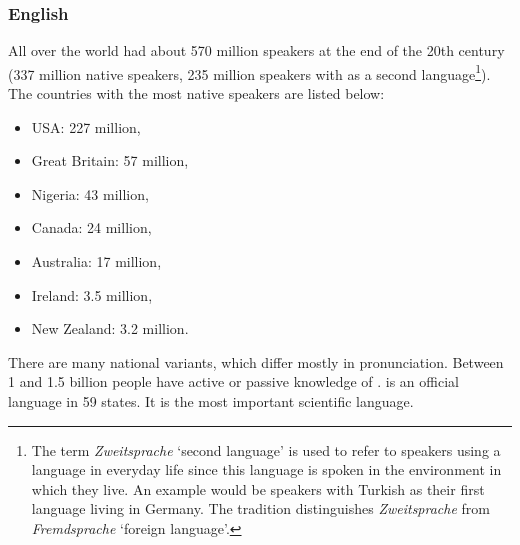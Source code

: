 \subsubsection{English}

All over the world  had about 570 million speakers at the end of the 20th century 
(337 million native speakers, 235 million speakers with  as a second language\footnote{%
  The term \emph{Zweitsprache} `second language' is used to refer to speakers using a language in
  everyday life since this language is spoken in the environment in which they live. An example would be speakers with
  Turkish as their first language living in Germany. The  tradition distinguishes
  \emph{Zweitsprache} from \emph{Fremdsprache} `foreign language'.%
}). The countries with the most native speakers are listed below: 
\begin{itemize}
\item USA: 227 million,
\item Great Britain: 57 million,
\item Nigeria: 43 million, 
\item Canada: 24 million,
\item Australia: 17 million,
\item Ireland: 3.5 million,
\item New Zealand: 3.2 million.
\end{itemize}
There are many national variants, which differ mostly in pronunciation.
Between 1 and 1.5 billion people have active or passive knowledge of .
 is an official language in 59 states. It is the most important scientific language.%




